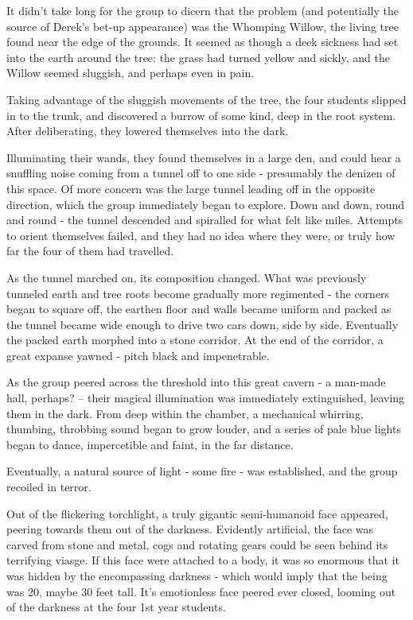 \documentclass[oneside]{book}
\begin{document}
It didn't take long for the group to dicern that the problem (and potentially the source of Derek's bet-up appearance) was the Whomping Willow, the living tree found near the edge of the grounds. It seemed as though a deek sickness had set into the earth around the tree: the grass had turned yellow and sickly, and the Willow seemed sluggish, and perhaps even in pain. 

Taking advantage of the sluggish movements of the tree, the four students slipped in to the trunk, and discovered a burrow of some kind, deep in the root system. After deliberating, they lowered themselves into the dark. 

Illuminating their wands, they found themselves in a large den, and could hear a snuffling noise coming from a tunnel off to one side - presumably the denizen of this space. Of more concern was the large tunnel leading off in the opposite direction, which the group immediately began to explore. Down and down, round and round - the tunnel descended and spiralled for what felt like miles. Attempts to orient themselves failed, and they had no idea where they were, or truly how far the four of them had travelled. 

As the tunnel marched on, its composition changed. What was previously tunneled earth and tree roots become gradually more regimented - the corners began to square off, the earthen floor and walls became uniform and packed as the tunnel became wide enough to drive two cars down, side by side. Eventually the packed earth morphed into a stone corridor. At the end of the corridor, a great expanse yawned - pitch black and impenetrable. 

As the group peered across the threshold into this great cavern - a man-made hall, perhaps? -- their magical illumination was immediately extinguished, leaving them in the dark. From deep within the chamber, a mechanical whirring, thumbing, throbbing sound began to grow louder, and a series of pale blue lights began to dance, impercetible and faint, in the far distance. 

Eventually, a natural source of light - some fire - was established, and the group recoiled in terror. 

Out of the flickering torchlight, a truly gigantic semi-humanoid face appeared, peering towards them out of the darkness. Evidently artificial, the face was carved from stone and metal, cogs and rotating gears could be seen behind its terrifying viasge. If this face were attached to a body, it was so enormous that it was hidden by the encompassing darkness - which would imply that the being was 20, maybe 30 feet tall. It's emotionless face peered ever closed, looming out of the darkness at the four 1st year students. 
\end{document}
